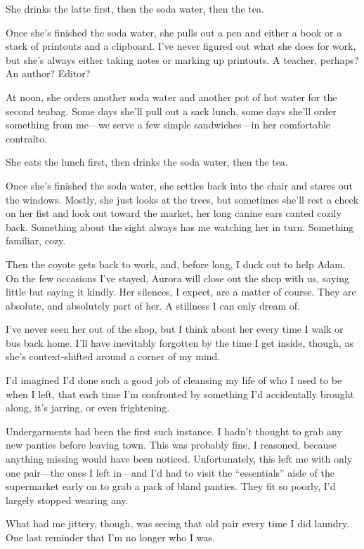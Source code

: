 She drinks the latte first, then the soda water, then the tea.

Once she's finished the soda water, she pulls out a pen and either a book or a stack of printouts and a clipboard. I've never figured out what she does for work, but she's always either taking notes or marking up printouts. A teacher, perhaps? An author? Editor?

At noon, she orders another soda water and another pot of hot water for the second teabag. Some days she'll pull out a sack lunch, some days she'll order something from me---we serve a few simple sandwiches---in her comfortable contralto.

She eats the lunch first, then drinks the soda water, then the tea.

Once she's finished the soda water, she settles back into the chair and stares out the windows. Mostly, she just looks at the trees, but sometimes she'll rest a cheek on her fist and look out toward the market, her long canine ears canted cozily back. Something about the sight always has me watching her in turn. Something familiar, cozy.

Then the coyote gets back to work, and, before long, I duck out to help Adam. On the few occasions I've stayed, Aurora will close out the shop with us, saying little but saying it kindly. Her silences, I expect, are a matter of course. They are absolute, and absolutely part of her. A stillness I can only dream of.

I've never seen her out of the shop, but I think about her every time I walk or bus back home. I'll have inevitably forgotten by the time I get inside, though, as she's context-shifted around a corner of my mind.

\secdiv{}

\noindent I'd imagined I'd done such a good job of cleansing my life of who I used to be when I left, that each time I'm confronted by something I'd accidentally brought along, it's jarring, or even frightening.

Undergarments had been the first such instance. I hadn't thought to grab any new panties before leaving town. This was probably fine, I reasoned, because anything missing would have been noticed. Unfortunately, this left me with only one pair---the ones I left in---and I'd had to visit the ``essentials'' aisle of the supermarket early on to grab a pack of bland panties. They fit so poorly, I'd largely stopped wearing any.

What had me jittery, though, was seeing that old pair every time I did laundry. One last reminder that I'm no longer who I was.

